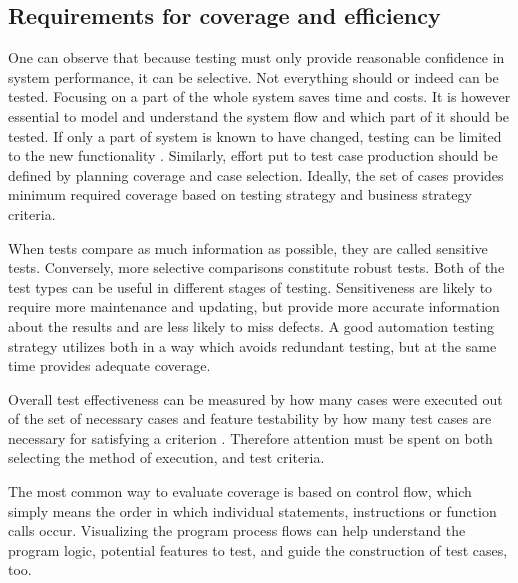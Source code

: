 \documentclass[12pt,a4paper,oneside,pdftex]{report}
\begin{document}
\subsection{Requirements for coverage and efficiency}

One can observe that because testing must only provide reasonable confidence in system performance, it can be selective. Not everything should or indeed can be tested. Focusing on a part of the whole system saves time and costs. It is however essential to model and understand the system flow and which part of it should be tested. If only a part of system is known to have changed, testing can be limited to the new functionality \citep{bhuyan2012survey}. Similarly, effort put to test case production should be defined by planning coverage and case selection. Ideally, the set of cases provides minimum required coverage based on testing strategy and business strategy criteria. 

When tests compare as much information as possible, they are called sensitive tests. Conversely, more selective comparisons constitute robust tests. Both of the test types can be useful in different stages of testing. Sensitiveness are likely to require more maintenance and updating, but provide more accurate information about the results and are less likely to miss defects. A good automation testing strategy utilizes both in a way which avoids redundant testing, but at the same time provides adequate coverage. \citep{fewster1999software}

Overall test effectiveness can be measured by how many cases were executed out of the set of necessary cases and feature testability by how many test cases are necessary for satisfying a criterion \citep{linnenkugel1990test}. Therefore attention must be spent on both selecting the method of execution, and test criteria. 

The most common way to evaluate coverage is based on control flow, which simply means the order in which individual statements, instructions or function calls occur. Visualizing the program process flows can help understand the program logic, potential features to test, and guide the construction of test cases, too. \citep{burnstein2003practical} 
\end{document}
